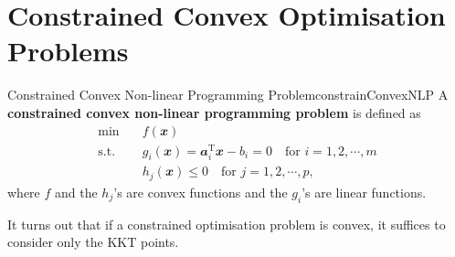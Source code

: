 \documentclass[math, code]{amznotes}
\theoremstyle{remark}
\begin{document}
\section{Constrained Convex Optimisation Problems}
\begin{dfnbox}{Constrained Convex Non-linear Programming Problem}{constrainConvexNLP}
    A {\color{red} \textbf{constrained convex non-linear programming problem}} is defined as
    \begin{align*}
        \min & \quad f(\mathbfit{x}) \\
        \mathrm{s.t.} & \quad g_i(\mathbfit{x}) = \mathbfit{a}_i^{\mathrm{T}}\mathbfit{x} - b_i = 0 \quad\textrm{for } i = 1, 2, \cdots, m \\
        & \quad h_j(\mathbfit{x}) \leq 0 \quad\textrm{for } j = 1, 2, \cdots, p,
    \end{align*}
    where $f$ and the $h_j$'s are convex functions and the $g_i$'s are linear functions. 
\end{dfnbox}
It turns out that if a constrained optimisation problem is convex, it suffices to consider only the KKT points.
\end{document}
